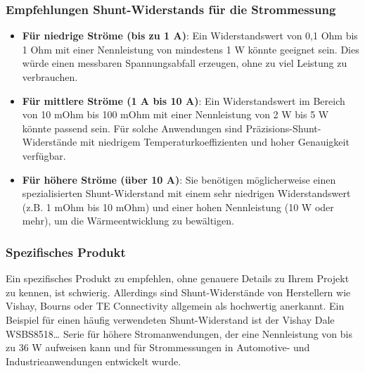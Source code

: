 \documentclass{vorlage-design-main}
\begin{document}
\hypertarget{empfehlungen-shunt-widerstands-fuxfcr-die-strommessung}{%
\subsubsection{Empfehlungen Shunt-Widerstands für die
Strommessung}\label{empfehlungen-shunt-widerstands-fuer-die-strommessung}}

\begin{itemize}
\item
  \textbf{Für niedrige Ströme (bis zu 1 A)}: Ein Widerstandswert von 0,1
  Ohm bis 1 Ohm mit einer Nennleistung von mindestens 1 W könnte
  geeignet sein. Dies würde einen messbaren Spannungsabfall erzeugen,
  ohne zu viel Leistung zu verbrauchen.
\item
  \textbf{Für mittlere Ströme (1 A bis 10 A)}: Ein Widerstandswert im
  Bereich von 10 mOhm bis 100 mOhm mit einer Nennleistung von 2 W bis 5
  W könnte passend sein. Für solche Anwendungen sind
  Präzisions-Shunt-Widerstände mit niedrigem Temperaturkoeffizienten und
  hoher Genauigkeit verfügbar.
\item
  \textbf{Für höhere Ströme (über 10 A)}: Sie benötigen möglicherweise
  einen spezialisierten Shunt-Widerstand mit einem sehr niedrigen
  Widerstandswert (z.B. 1 mOhm bis 10 mOhm) und einer hohen Nennleistung
  (10 W oder mehr), um die Wärmeentwicklung zu bewältigen.
\end{itemize}

\hypertarget{spezifisches-produkt}{%
\subsubsection{Spezifisches Produkt}\label{spezifisches-produkt}}

Ein spezifisches Produkt zu empfehlen, ohne genauere Details zu Ihrem
Projekt zu kennen, ist schwierig. Allerdings sind Shunt-Widerstände von
Herstellern wie Vishay, Bourns oder TE Connectivity allgemein als
hochwertig anerkannt. Ein Beispiel für einen häufig verwendeten
Shunt-Widerstand ist der Vishay Dale WSBS8518\ldots{} Serie für höhere
Stromanwendungen, der eine Nennleistung von bis zu 36 W aufweisen kann
und für Strommessungen in Automotive- und Industrieanwendungen
entwickelt wurde. %


\clearpage
\printbibliography
\end{document}
